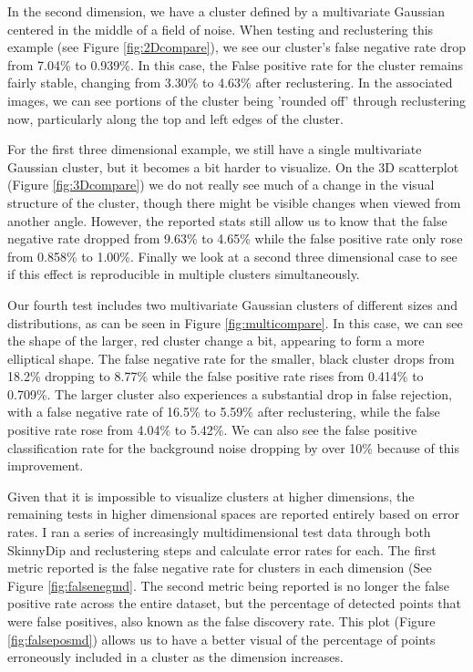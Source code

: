 \documentclass{sig-alternate-05-2015}
\begin{document}
In the second dimension, we have a cluster defined by a multivariate Gaussian centered in the middle of a field of noise. When testing and reclustering this example (see Figure \ref{fig:2Dcompare}), we see our cluster's false negative rate drop from 7.04\% to 0.939\%. In this case, the False positive rate for the cluster remains fairly stable, changing from 3.30\% to 4.63\% after reclustering. In the associated images, we can see portions of the cluster being 'rounded off' through reclustering now, particularly along the top and left edges of the cluster.

For the first three dimensional example, we still have a single multivariate Gaussian cluster, but it becomes a bit harder to visualize. On the 3D scatterplot (Figure \ref{fig:3Dcompare}) we do not really see much of a change in the visual structure of the cluster, though there might be visible changes when viewed from another angle. However, the reported stats still allow us to know that the false negative rate dropped from 9.63\% to 4.65\% while the false positive rate only rose from 0.858\% to 1.00\%. Finally we look at a second three dimensional case to see if this effect is reproducible in multiple clusters simultaneously.

Our fourth test includes two multivariate Gaussian clusters of different sizes and distributions, as can be seen in Figure \ref{fig:multicompare}. In this case, we can see the shape of the larger, red cluster change a bit, appearing to form a more elliptical shape. The false negative rate for the smaller, black cluster drops from 18.2\% dropping to 8.77\% while the false positive rate rises from 0.414\% to 0.709\%. The larger cluster also experiences a substantial drop in false rejection, with a false negative rate of 16.5\% to 5.59\% after reclustering, while the false positive rate rose from 4.04\% to 5.42\%. We can also see the false positive classification rate for the background noise dropping by over 10\% because of this improvement.

Given that it is impossible to visualize clusters at higher dimensions, the remaining tests in higher dimensional spaces are reported entirely based on error rates. I ran a series of increasingly multidimensional test data through both SkinnyDip and reclustering steps and calculate error rates for each. The first metric reported is the false negative rate for clusters in each dimension (See Figure \ref{fig:falsenegmd}. The second metric being reported is no longer the false positive rate across the entire dataset, but the percentage of detected points that were false positives, also known as the false discovery rate. This plot (Figure \ref{fig:falseposmd}) allows us to have a better visual of the percentage of points erroneously included in a cluster as the dimension increases.
\end{document}
